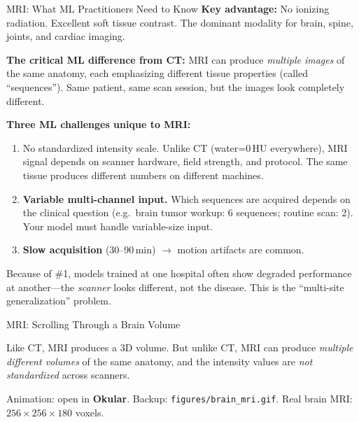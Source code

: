 \documentclass[aspectratio=169,10pt]{beamer}
\begin{document}
\begin{frame}{MRI: What ML Practitioners Need to Know}
\textbf{Key advantage:} No ionizing radiation. Excellent soft tissue contrast. The dominant modality for brain, spine, joints, and cardiac imaging.

\vspace{0.3em}
\textbf{The critical ML difference from CT:} MRI can produce \emph{multiple images} of the same anatomy, each emphasizing different tissue properties (called ``sequences''). Same patient, same scan session, but the images look completely different.

\vspace{0.3em}
\pause
\textbf{Three ML challenges unique to MRI:}
\begin{enumerate}
    \item \alert{No standardized intensity scale.} Unlike CT (water=0\,HU everywhere), MRI signal depends on scanner hardware, field strength, and protocol. The same tissue produces different numbers on different machines.
    \item \textbf{Variable multi-channel input.} Which sequences are acquired depends on the clinical question (e.g.\ brain tumor workup: 6 sequences; routine scan: 2). Your model must handle variable-size input.
    \item \textbf{Slow acquisition} (30--90\,min) $\to$ motion artifacts are common.
\end{enumerate}

{\small Because of \#1, models trained at one hospital often show degraded performance at another---the \emph{scanner} looks different, not the disease. This is the ``multi-site generalization'' problem.}
\end{frame}

\begin{frame}{MRI: Scrolling Through a Brain Volume}
\begin{center}
\end{center}
\vspace{-0.3em}
Like CT, MRI produces a 3D volume. But unlike CT, MRI can produce \emph{multiple different volumes} of the same anatomy, and the intensity values are \emph{not standardized} across scanners.

\vspace{0.2em}
{\small Animation: open in \textbf{Okular}. Backup: \texttt{figures/brain\_mri.gif}. Real brain MRI: $256{\times}256{\times}180$ voxels.}
\end{frame}
\end{document}
